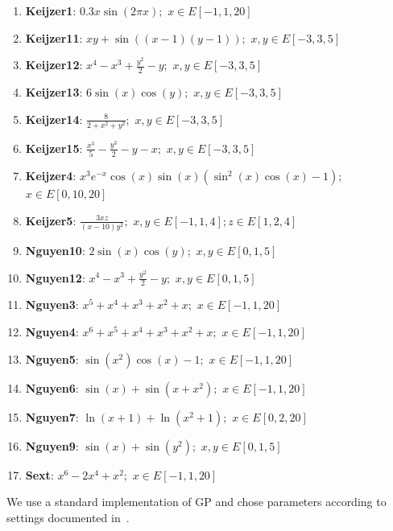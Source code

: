 \begin{enumerate}[noitemsep]
\item \textbf{Keijzer1}: $0.3x \sin(2 \pi x);$ $x \in E[-1,1,20]$
\item \textbf{Keijzer11}: $x y+\sin((x-1)(y-1));$ $x, y \in E[-3,3,5]$
\item \textbf{Keijzer12}: $x^{4}-x^{3}+\frac{y^{2}}{2}-y;$ $x, y \in E[-3,3,5]$
\item \textbf{Keijzer13}: $6 \sin(x) \cos(y);$ $x, y \in E[-3,3,5]$
\item \textbf{Keijzer14}: $\frac{8}{2 + x^{2} + y^{2}};$ $x,y \in E[-3,3,5]$
\item \textbf{Keijzer15}: $\frac{x^{3}}{5} - \frac{y^{3}}{2} - y - x;$ $x, y \in E[-3,3,5]$
\item \textbf{Keijzer4}: $x^{3} e^{-x} \cos(x) \sin(x) (\sin^{2}(x) \cos(x) - 1);$ $x \in E[0,10,20]$
\item \textbf{Keijzer5}: $\frac{3 x z}{(x - 10) y^{2}};$ $x,y \in E[-1,1,4]; z \in E[1,2,4]$
\item \textbf{Nguyen10}: $2 \sin(x) \cos(y);$ $x,y \in E[0,1,5]$
\item \textbf{Nguyen12}: $x^{4} - x^{3} + \frac{y^{2}}{2} - y;$ $x,y \in E[0,1,5]$
\item \textbf{Nguyen3}: $x^{5} + x^{4} + x^{3} + x^{2} + x;$ $x \in E[-1,1,20]$
\item \textbf{Nguyen4}: $x^{6} + x^{5} + x^{4} + x^{3} + x^{2} + x;$ $x \in E[-1,1,20]$
\item \textbf{Nguyen5}: $\sin(x^{2}) \cos(x) - 1;$ $x \in E[-1,1,20]$
\item \textbf{Nguyen6}: $\sin(x) + \sin(x + x^{2});$ $x \in E[-1,1,20]$
\item \textbf{Nguyen7}: $\ln(x + 1) + \ln(x^{2} + 1);$ $x \in E[0,2,20]$
\item \textbf{Nguyen9}: $\sin(x) + \sin(y^{2});$ $x,y \in E[0,1,5]$
\item \textbf{Sext}: $x^{6} - 2 x^{4} + x^{2};$ $x \in E[-1,1,20]$
\end{enumerate}

We use a standard implementation of GP and chose parameters according to settings documented in~\cite{krawiecGecco2014}.


